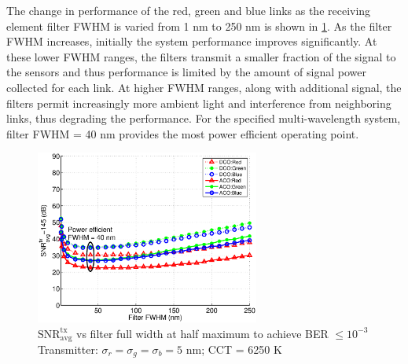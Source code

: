 The change in performance of the red, green and blue links as the receiving element filter FWHM is varied from 1 nm to 250 nm is shown in \figurename{\ref{fig:SNRvsFLTWID}}. As the filter FWHM increases, initially the system performance improves significantly. At these lower FWHM ranges, the filters transmit a smaller fraction of the signal to the sensors and thus performance is limited by the amount of signal power collected for each link. At higher FWHM ranges, along with additional signal, the filters permit increasingly more ambient light and interference from neighboring links, thus degrading the performance. For the specified multi-wavelength system, filter FWHM = 40 nm provides the most power efficient operating point.

\begin{figure}[!t]
	\centering
		\includegraphics[trim={0.15in 0.05in 0.05in 0.35in}, clip=true, width=2.9in]{img/SNRvsFLTWID.eps}
	\caption{$\text{SNR}^{\text{tx}}_{\text{avg}}$ vs filter full width at half maximum to achieve BER $\leq 10^{-3}$\newline Transmitter: $\sigma_r = \sigma_g = \sigma_b = 5$ nm; CCT = 6250 K}
	\label{fig:SNRvsFLTWID}
\end{figure}










